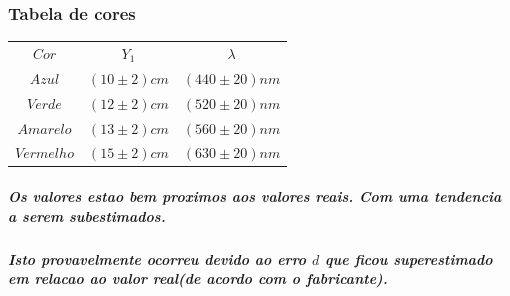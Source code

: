 \documentclass[12pt,twoside, a4paper, twocolumn]{article}
\begin{document}
\subsubsection{Tabela de cores}
\begin{center}
  \begin{tabular}{ |c|c|c| }
    \hline
    $Cor$      & $Y_1$          & $\lambda$        \\
    $Azul$     & $(10 \pm 2)cm$ & $(440 \pm 20)nm$ \\
    $Verde$    & $(12 \pm 2)cm$ & $(520 \pm 20)nm$ \\
    $Amarelo$  & $(13 \pm 2)cm$ & $(560 \pm 20)nm$ \\
    $Vermelho$ & $(15 \pm 2)cm$ & $(630 \pm 20)nm$ \\

    \hline
  \end{tabular}
\end{center}

\subparagraph*{Os valores estao bem proximos aos valores reais. Com uma tendencia a serem subestimados. }

\subparagraph*{Isto provavelmente ocorreu devido ao erro $d$ que ficou superestimado em relacao ao valor real(de acordo com o fabricante).}
\end{document}
